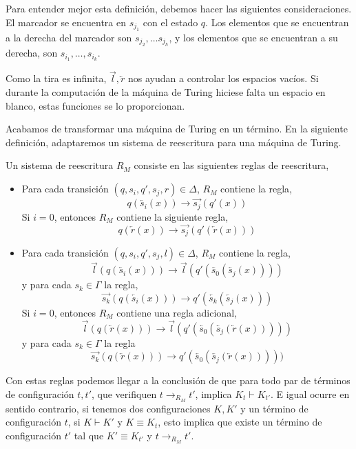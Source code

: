 Para entender mejor esta definición, debemos hacer las siguientes
consideraciones. El marcador se encuentra en $s_{j_1}$ con el estado
$q$. Los elementos que se encuentran a la derecha del marcador son
$s_{j_2}, \dots s_{j_h}$, y los elementos que se encuentran a su
derecha, son $s_{i_1}, \dots, s_{i_k}$. 

Como la tira es infinita, $\overrightarrow{l}, \overleftarrow{r}$ nos
ayudan a controlar los espacios vacíos. Si durante la computación de
la máquina de Turing hiciese falta un espacio en blanco, estas
funciones se lo proporcionan.


Acabamos de transformar una máquina de Turing en un término. En la
siguiente definición, adaptaremos un sistema de reescritura para una
máquina de Turing.

\begin{defi}
  Un sistema de reescritura $R_M$ consiste en las siguientes reglas de
  reescritura,
\begin{itemize}
\item Para cada transición $(q, s_i, q', s_j, r) \in \Delta$, $R_M$
  contiene la regla,
\[
  q(\overleftarrow{s_i}(x)) \rightarrow \overrightarrow{s_j}(q'(x))
\]
Si $i=0$, entonces $R_M$ contiene la siguiente regla,
\[
  q(\overleftarrow{r}(x)) \rightarrow
  \overrightarrow{s_j}(q'(\overleftarrow{r}(x)))
\]
\item Para cada transición $(q,s_i,q',s_j,l) \in \Delta$, $R_M$
  contiene la regla,
\[
  \overrightarrow{l}(q(\overleftarrow{s_i}(x))) \rightarrow
  \overrightarrow{l}(q'(\overleftarrow{s_0}(\overleftarrow{s_j}(x))))
\]
y para cada $s_k \in \Gamma$ la regla,
\[
  \overrightarrow{s_k}(q(\overleftarrow{s_i}(x))) \rightarrow
  q'(\overleftarrow{s_k}(\overleftarrow{s_j}(x)))
\]
Si $i=0$, entonces $R_M$ contiene una regla adicional,
\[
  \overrightarrow{l}(q(\overleftarrow{r}(x))) \rightarrow
  \overrightarrow{l}(q'(\overleftarrow{s_0}(\overleftarrow{s_j}(\overleftarrow{r}(x)))))
\]
y para cada $s_k \in \Gamma$ la regla
\[
  \overrightarrow{s_k}(q(\overleftarrow{r}(x))) \rightarrow
  q'(\overleftarrow{s_0}(\overleftarrow{s_j}(\overleftarrow{r}(x)))))
\]
\end{itemize}
\end{defi}

Con estas reglas podemos llegar a la conclusión de que para todo par
de términos de configuración $t, t'$, que verifiquen
$t \rightarrow_{R_M} t'$, implica $K_t \vdash K_{t'}$. E igual ocurre
en sentido contrario, si tenemos dos configuraciones $K, K'$ y un
término de configuración $t$, si $K \vdash K'$ y $K \equiv K_t$, esto
implica que existe un término de configuración $t'$ tal que
$K' \equiv K_{t'}$ y $t \rightarrow_{R_M} t'$. \label{prop:4}

